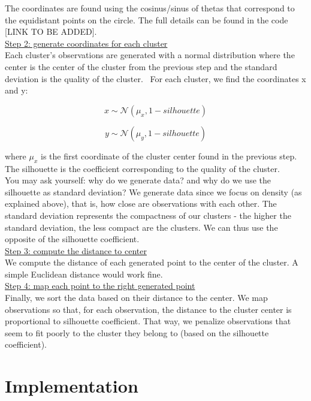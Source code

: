 The coordinates are found using the cosinus/sinus of thetas that correspond to the equidistant points on the circle. The full details can be found in the code [LINK TO BE ADDED]. \\

\underline{Step 2: generate coordinates for each cluster} \\

Each cluster's observations are generated with a normal distribution where the center is the center of the cluster from the previous step and the standard deviation is the quality of the cluster. 
For each cluster, we find the coordinates x and y:

$$x \sim \mathcal{N}(\mu_x, 1-silhouette)$$

$$y \sim \mathcal{N}(\mu_y, 1-silhouette)$$

where $\mu_x$ is the first coordinate of the cluster center found in the previous step. The silhouette is the coefficient corresponding to the quality of the cluster. \\

You may ask yourself: why do we generate data? and why do we use the silhouette as standard deviation? We generate data since we focus on density (as explained above), that is, how close are observations with each other. The standard deviation represents the compactness of our clusters - the higher the standard deviation, the less compact are the clusters. We can thus use the opposite of the silhouette coefficient. \\

\underline{Step 3: compute the distance to center} \\

We compute the distance of each generated point to the center of the cluster. A simple Euclidean distance would work fine. \\

\underline{Step 4: map each point to the right generated point} \\

Finally, we sort the data based on their distance to the center. We map observations so that, for each observation, the distance to the cluster center is proportional to silhouette coefficient. That way, we penalize observations that seem to fit poorly to the cluster they belong to (based on the silhouette coefficient).

\section{Implementation}

